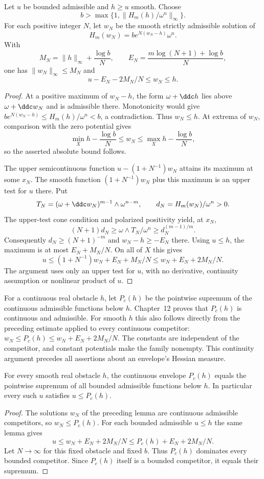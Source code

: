 \begin{lemma}\label{draft:607-bounded-penalty-squeeze}
Let $u$ be bounded admissible and $h\geq u$ smooth. Choose
\[
 b>\max\{1,\|H_m(h)/\omega^n\|_\infty\}.
\]
For each positive integer $N$, let $w_N$ be the smooth strictly
admissible solution of
\[
 H_m(w_N)=b e^{N(w_N-h)}\omega^n.
\]
With
\[
 M_N=\|h\|_\infty+\frac{\log b}{N},\qquad
 E_N=\frac{m\log(N+1)+\log b}{N},
\]
one has $\|w_N\|_\infty\leq M_N$ and
\[
 u-E_N-2M_N/N\leq w_N\leq h.
\]
\end{lemma}
\begin{proof}
At a positive maximum of $w_N-h$, the form $\omega+\ddc h$
lies above $\omega+\ddc w_N$ and is admissible there. Monotonicity
would give $b e^{N(w_N-h)}\leq H_m(h)/\omega^n<b$, a contradiction.
Thus $w_N\leq h$. At extrema of $w_N$, comparison with the zero
potential gives
\[
 \min_X h-\frac{\log b}{N}\leq w_N
                \leq\max_X h-\frac{\log b}{N},
\]
so the asserted absolute bound follows.

The upper semicontinuous function $u-(1+N^{-1})w_N$ attains its
maximum at some $x_N$. The smooth function $(1+N^{-1})w_N$ plus
this maximum is an upper test for $u$ there. Put
\[
 T_N=(\omega+\ddc w_N)^{m-1}\wedge\omega^{n-m},
 \qquad d_N=H_m(w_N)/\omega^n>0.
\]
The upper-test cone condition and polarized positivity yield, at $x_N$,
\[
 (N+1)d_N\geq\omega\wedge T_N/\omega^n
                           \geq d_N^{(m-1)/m}.
\]
Consequently $d_N\geq(N+1)^{-m}$ and $w_N-h\geq-E_N$ there.
Using $u\leq h$, the maximum is at most $E_N+M_N/N$.
On all of $X$ this gives
\[
 u\leq(1+N^{-1})w_N+E_N+M_N/N
                     \leq w_N+E_N+2M_N/N.
\]
The argument uses only an upper test for $u$, with no derivative,
continuity assumption or nonlinear product of $u$.
\end{proof}

For a continuous real obstacle $h$, let $P_c(h)$ be the pointwise
supremum of the continuous admissible functions below $h$. Chapter~12
proves that $P_c(h)$ is continuous and admissible. For smooth $h$ this
also follows directly from the preceding estimate applied to every
continuous competitor: $w_N\leq P_c(h)\leq w_N+E_N+2M_N/N$.
The constants are independent of the competitor, and constant
potentials make the family nonempty. This continuity argument precedes
all assertions about an envelope's Hessian measure.

\begin{proposition}\label{draft:607-bounded-envelope}
For every smooth real obstacle $h$, the continuous envelope $P_c(h)$
equals the pointwise supremum of all bounded admissible functions
below $h$. In particular every such $u$ satisfies $u\leq P_c(h)$.
\end{proposition}
\begin{proof}
The solutions $w_N$ of the preceding lemma are continuous admissible
competitors, so $w_N\leq P_c(h)$. For each bounded admissible
$u\leq h$ the same lemma gives
\[
 u\leq w_N+E_N+2M_N/N\leq P_c(h)+E_N+2M_N/N.
\]
Let $N\to\infty$ for this fixed obstacle and fixed $b$.
Thus $P_c(h)$ dominates every bounded competitor. Since $P_c(h)$
itself is a bounded competitor, it equals their supremum.
\end{proof}

